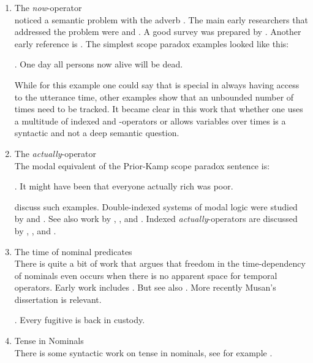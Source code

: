 \begin{enumerate}
  
  \item The \emph{now}-operator\\[6pt]
  \citet{prior:now} noticed a semantic problem with the adverb . The main early researchers that addressed the problem were \citet{kamp:now} and \citet{vlach:diss}. A good survey was prepared by \citet{vanbenthem:tenselogic}. Another early reference is \citet{saarinen:backward}. The simplest scope paradox examples looked like this:
  
  \ex. One day all persons now alive will be dead.
  
  While for this example one could say that  is special in always having access to the utterance time, other examples show that an unbounded number of times need to be tracked. It became clear in this work that whether one uses a multitude of indexed  and -operators or allows variables over times is a syntactic and not a deep semantic question.
  
  \medskip\item The \emph{actually}-operator\\[6pt]
  The modal equivalent of the Prior-Kamp scope paradox sentence is:
  
  \ex. It might have been that everyone actually rich was poor.
  
  \citet{crossley-humberstone} discuss such examples. Double-indexed systems of modal logic were studied by \citet{segerberg} and \citet{aqvist:1973:modal}. See also work by \citet{lewis:anselm}, \citet{vaninwagen:actuality}, and \citet{hazen:actuality}. Indexed \emph{actually}-operators are discussed by \citet{prior-fine}, \citet{peacocke:necessity}, and \citet{forbes:physicalism,forbes:metaphysics,forbes:possibility}.
  
  \medskip\item The time of nominal predicates\\[6pt]
  There is quite a bit of work that argues that freedom in the time-dependency of nominals even occurs when there is no apparent space for temporal operators. Early work includes \citet{enc:diss, enc:L&P:86}. But see also \citet{ejerhed:tense}. More recently Musan's dissertation \citep{musan:diss} is relevant.
  
  \ex. Every fugitive is back in custody.
  
  \medskip\item Tense in Nominals\\[6pt]
  There is some syntactic work on tense in nominals, see for example \citet{wiltschko:tenseond}.
  

\end{enumerate}
